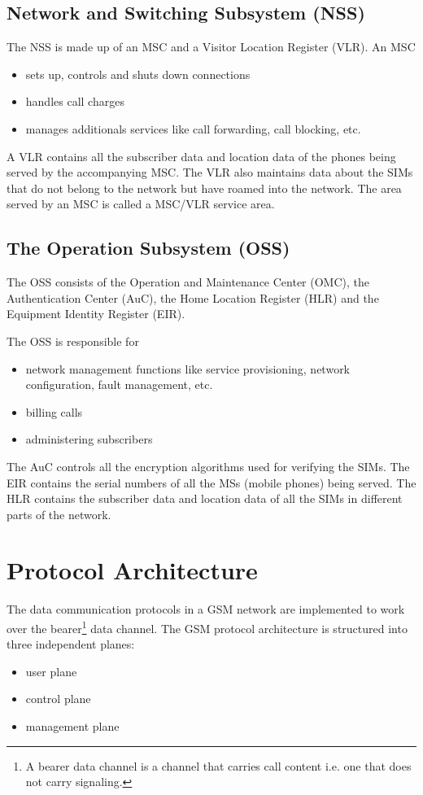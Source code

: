 \subsection{Network and Switching Subsystem (NSS)}

The NSS is made up of an MSC and a Visitor Location Register (VLR). An MSC 
\begin{itemize}[noitemsep,topsep=0pt,parsep=0pt,partopsep=0pt]
\item sets up, controls and shuts down connections
\item handles call charges
\item manages additionals services like call forwarding, call blocking, etc.
\end{itemize}

A VLR contains all the subscriber data and location data of the phones being 
served by the accompanying MSC. The VLR also maintains data about the SIMs 
that do not belong to the network but have roamed into the network. The area 
served by an MSC is called a MSC/VLR service area.

\subsection{The Operation Subsystem (OSS)}

The OSS consists of the Operation and Maintenance Center (OMC), the 
Authentication Center (AuC), the Home Location Register (HLR) and the 
Equipment Identity Register (EIR).

The OSS is responsible for
\begin{itemize}[noitemsep,topsep=0pt,parsep=0pt,partopsep=0pt]
\item network management functions like service provisioning, network 
configuration, fault management, etc.
\item billing calls
\item administering subscribers
\end{itemize}

The AuC controls all the encryption algorithms used for verifying the SIMs. 
The EIR contains the serial numbers of all the MSs (mobile phones) being 
served. The HLR contains the subscriber data and location data of all the 
SIMs in different parts of the network.



\section{Protocol Architecture}
The data communication protocols in a GSM network are implemented to work over
the bearer\footnote{A bearer data channel is a channel that carries call 
content i.e.
one that does not carry signaling.} data channel. 
The GSM protocol architecture is structured into three independent planes:
\begin{itemize}[noitemsep,topsep=0pt,parsep=0pt,partopsep=0pt]
 \item user plane
 \item control plane
 \item management plane
\end{itemize}

